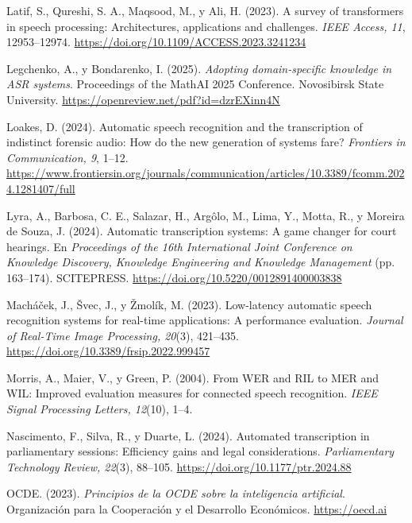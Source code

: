 \documentclass[12pt,a4paper,oneside]{report}
\begin{document}
\vspace{6pt}
Latif, S., Qureshi, S. A., Maqsood, M., y Ali, H. (2023). A survey of transformers in speech processing: Architectures, applications and challenges. \textit{IEEE Access, 11}, 12953--12974. \url{https://doi.org/10.1109/ACCESS.2023.3241234}

\vspace{6pt}
Legchenko, A., y Bondarenko, I. (2025). \textit{Adopting domain-specific knowledge in ASR systems}. Proceedings of the MathAI 2025 Conference. Novosibirsk State University. \url{https://openreview.net/pdf?id=dzrEXinn4N}

\vspace{6pt}
Loakes, D. (2024). Automatic speech recognition and the transcription of indistinct forensic audio: How do the new generation of systems fare? \textit{Frontiers in Communication, 9}, 1--12. \url{https://www.frontiersin.org/journals/communication/articles/10.3389/fcomm.2024.1281407/full}

\vspace{6pt}
Lyra, A., Barbosa, C. E., Salazar, H., Argôlo, M., Lima, Y., Motta, R., y Moreira de Souza, J. (2024). Automatic transcription systems: A game changer for court hearings. En \textit{Proceedings of the 16th International Joint Conference on Knowledge Discovery, Knowledge Engineering and Knowledge Management} (pp. 163--174). SCITEPRESS. \url{https://doi.org/10.5220/0012891400003838}

\vspace{6pt}
Macháček, J., Švec, J., y Žmolík, M. (2023). Low-latency automatic speech recognition systems for real-time applications: A performance evaluation. \textit{Journal of Real-Time Image Processing, 20}(3), 421--435. \url{https://doi.org/10.3389/frsip.2022.999457}

\vspace{6pt}
Morris, A., Maier, V., y Green, P. (2004). From WER and RIL to MER and WIL: Improved evaluation measures for connected speech recognition. \textit{IEEE Signal Processing Letters, 12}(10), 1--4.

\vspace{6pt}
Nascimento, F., Silva, R., y Duarte, L. (2024). Automated transcription in parliamentary sessions: Efficiency gains and legal considerations. \textit{Parliamentary Technology Review, 22}(3), 88--105. \url{https://doi.org/10.1177/ptr.2024.88}

\vspace{6pt}
OCDE. (2023). \textit{Principios de la OCDE sobre la inteligencia artificial}. Organización para la Cooperación y el Desarrollo Económicos. \url{https://oecd.ai}
\end{document}
